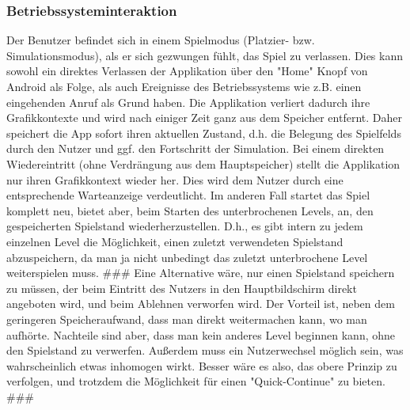 \subsubsection{Betriebssysteminteraktion}
Der Benutzer befindet sich in einem Spielmodus (Platzier- bzw. 
Simulationsmodus), als er sich gezwungen fühlt, das Spiel zu verlassen.
Dies kann sowohl ein direktes Verlassen der Applikation über den "Home"
Knopf von Android als Folge, als auch Ereignisse des Betriebssystems wie 
z.B. einen eingehenden Anruf als Grund haben. \newline
Die Applikation verliert dadurch ihre Grafikkontexte und wird nach einiger
Zeit ganz aus dem Speicher entfernt. Daher speichert die App sofort
ihren aktuellen Zustand, d.h. die Belegung des Spielfelds durch den Nutzer 
und ggf. den Fortschritt der Simulation. \newline
Bei einem direkten Wiedereintritt (ohne Verdrängung aus dem Hauptspeicher)
stellt die Applikation nur ihren Grafikkontext wieder her. Dies wird dem
Nutzer durch eine entsprechende Warteanzeige verdeutlicht. \newline
Im anderen Fall startet das Spiel komplett neu, bietet aber, beim
Starten des unterbrochenen Levels, an, den gespeicherten Spielstand
wiederherzustellen. D.h., es gibt intern zu jedem einzelnen Level die Möglichkeit,
einen zuletzt verwendeten Spielstand abzuspeichern, da man ja nicht
unbedingt das zuletzt unterbrochene Level weiterspielen muss.
\newline
\newline
\#\#\# Eine Alternative wäre, nur einen Spielstand speichern zu müssen, der 
beim Eintritt des Nutzers in den Hauptbildschirm direkt angeboten wird,
und beim Ablehnen verworfen wird. Der Vorteil ist, neben dem geringeren
Speicheraufwand, dass man direkt weitermachen kann, wo man aufhörte.
Nachteile sind aber, dass man kein anderes Level beginnen kann, ohne den
Spielstand zu verwerfen. Außerdem muss ein Nutzerwechsel möglich sein, 
was wahrscheinlich etwas inhomogen wirkt. Besser wäre es also, das
obere Prinzip zu verfolgen, und trotzdem die Möglichkeit für einen
"Quick-Continue" zu bieten. \#\#\#
